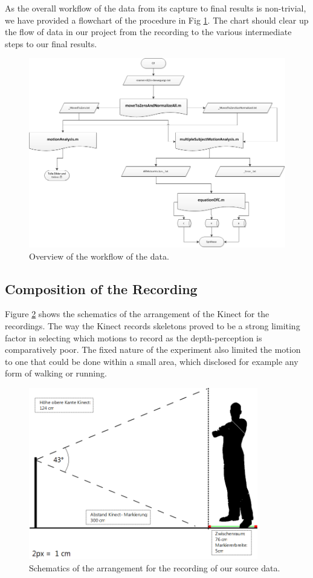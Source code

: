 \documentclass[a4paper]{article}
\begin{document}
As the overall workflow of the data from its capture to final results is non-trivial, we have provided a flowchart of the procedure in Fig \ref{fig:workflow}.
The chart should clear up the flow of data in our project from the recording to the various intermediate steps to our final results.

\begin{figure}
	\centering
	\includegraphics[width=14cm]{matlabaufbau.png}
	\caption{Overview of the workflow of the data.}
	\label{fig:workflow}
\end{figure}

\subsection{Composition of the Recording}

Figure \ref{fig:schematic} shows the schematics of the arrangement of the Kinect for the recordings.
The way the Kinect records skeletons proved to be a strong limiting factor in selecting which motions to record as the depth-perception is comparatively poor.
The fixed nature of the experiment also limited the motion to one that could be done within a small area, which disclosed for example any form of walking or running.

\begin{figure}
	\centering
	\includegraphics[width=10cm]{Aufbau.png}
	\caption{Schematics of the arrangement for the recording of our source data.}
	\label{fig:schematic}
\end{figure}
\end{document}
